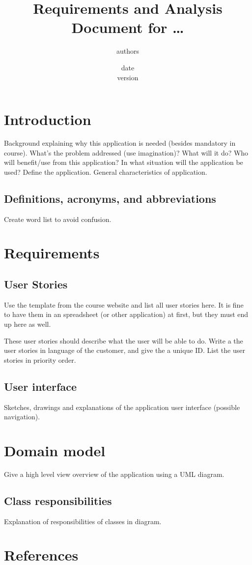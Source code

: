 \documentclass[12pt,a4paper]{scrartcl}
\title{Requirements and Analysis Document for \ldots}
\author{authors}
\date{date\\version}
\begin{document}
\maketitle

\section{Introduction}

Background explaining why this application is needed (besides mandatory in
course). What's the problem addressed (use imagination)? What will it do? Who
will benefit/use from this application? In what situation will the application
be used? Define the application. General characteristics of application.

\subsection{Definitions, acronyms, and abbreviations}

Create word list to avoid confusion.


\section{Requirements}

\subsection{User Stories}

Use the template from the course website and list all user stories here. It is
fine to have them in an spreadsheet (or other application) at first, but they 
must end up here as well.

These user stories should describe what the user will be able to do. Write a 
the user stories in language of the customer, and give the a unique ID. List the
user stories in priority order.

\subsection{User interface}

Sketches, drawings and explanations of the application user interface (possible
navigation).


\section{Domain model}

Give a high level view overview of the application using a UML diagram.

\subsection{Class responsibilities}

Explanation of responsibilities of classes in diagram.


\section{References}
\end{document}
